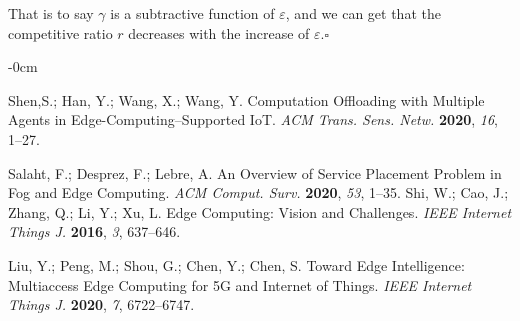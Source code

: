 \documentclass[journal,article,submit,pdftex,moreauthors]{Definitions/mdpi}
\begin{document}
That is to say $\gamma$ is a subtractive function of $\varepsilon$, and we can get that the  competitive ratio $r$ decreases with the increase of $\varepsilon$.$\square$\\




\begin{adjustwidth}{-\extralength}{0cm}



%

\begin{thebibliography}{999}

Shen,S.; Han, Y.; Wang, X.; Wang, Y. Computation Offloading with Multiple Agents in  Edge-Computing–Supported IoT. \emph{ACM Trans. Sens. Netw.} \textbf{2020}, \emph{16}, 1--27.

Salaht, F.; Desprez, F.; Lebre, A. An Overview of Service Placement Problem in Fog and Edge Computing. \emph{ACM Comput. Surv.} \textbf{2020}, \emph{53}, 1--35.
Shi, W.; Cao, J.; Zhang, Q.; Li, Y.; Xu, L. Edge Computing: Vision and Challenges. \emph{IEEE Internet Things J.} \textbf{2016}, \emph{3}, 637--646.

Liu, Y.; Peng, M.; Shou, G.; Chen, Y.; Chen, S. Toward Edge Intelligence: Multiaccess Edge Computing for 5G and Internet of Things. \emph{IEEE Internet Things J.} \textbf{2020}, \emph{7}, 6722--6747.


\end{thebibliography}
\end{adjustwidth}
\end{document}
